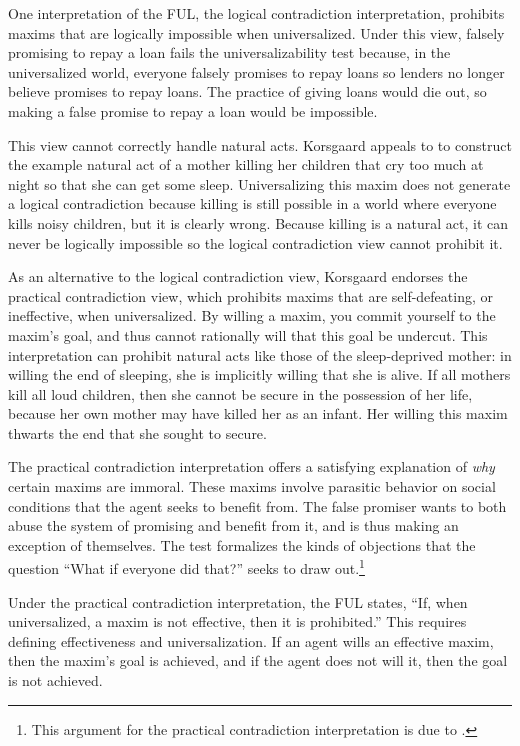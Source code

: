 \begin{isabellebody}
\begin{isamarkuptext}
One interpretation of the FUL, the logical contradiction interpretation, prohibits maxims that are 
logically impossible when universalized. Under this view, falsely promising to repay a loan fails the 
universalizability test because, in the universalized world, everyone falsely promises to repay
loans so lenders no longer believe promises to repay loans. The practice of giving loans would die out, so 
making a false promise to repay a loan would be impossible.

This view cannot correctly handle natural acts. Korsgaard appeals to 
\citet{dietrichson} to construct the example natural act of a mother killing her children that
cry too much at night so that she can get some sleep. Universalizing this maxim does not generate a logical 
contradiction because killing is still possible in a world where everyone kills noisy children, but 
it is clearly wrong. Because killing is a natural act, it can never be logically 
impossible so the logical contradiction view cannot prohibit it.

As an alternative to the logical contradiction view, Korsgaard endorses the practical contradiction view, 
which prohibits maxims that are self-defeating, or ineffective, when universalized. By willing a maxim, 
you commit yourself to the maxim's goal, and thus cannot rationally will that this goal be 
undercut. This interpretation can prohibit natural acts like those of the sleep-deprived mother: in 
willing the end of sleeping, she is implicitly willing that she is alive. If all mothers kill all 
loud children, then she cannot be secure in the possession of her life, because her own mother may 
have killed her as an infant. Her willing this maxim thwarts the end that she sought to secure. 

The practical contradiction interpretation offers a satisfying explanation of \emph{why} certain 
maxims are immoral. These maxims involve parasitic behavior on social conditions that the agent seeks 
to benefit from. The false promiser wants to both abuse the system of promising and benefit 
from it, and is thus making an exception of themselves. The test formalizes the kinds of objections 
that the question ``What if everyone did that?'' seeks to draw out.\footnote{This argument for the practical
contradiction interpretation is due to \citet{KorsgaardFUL}.}

Under the practical contradiction interpretation, the FUL states, ``If, when universalized, a maxim is 
not effective, then it is prohibited.'' This requires defining effectiveness and universalization. 
If an agent wills an effective maxim, then the maxim's goal is achieved, and if the agent does 
not will it, then the goal is not achieved. 


\end{isamarkuptext}
\end{isabellebody}
